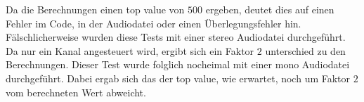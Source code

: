 Da die Berechnungen einen top value von $500$ ergeben, deutet dies auf einen Fehler im Code, in der Audiodatei oder einen Überlegungsfehler hin. Fälschlicherweise wurden diese Tests mit einer stereo Audiodatei durchgeführt. Da nur ein Kanal angesteuert wird, ergibt sich ein Faktor $2$ unterschied zu den Berechnungen. Dieser Test wurde folglich nocheimal mit einer mono Audiodatei durchgeführt. Dabei ergab sich das der top value, wie erwartet, noch um Faktor $2$ vom berechneten Wert abweicht. 


